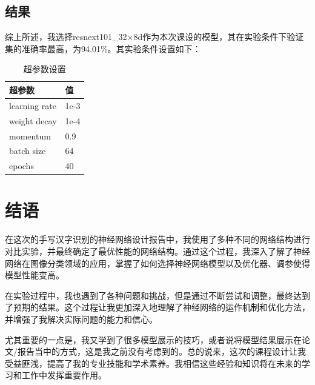 \documentclass[10.5pt,a4paper]{article}%
\begin{document}
        \subsection{结果}
        综上所述，我选择resnext101\_32$\times$8d作为本次课设的模型，其在实验条件下验证集的准确率最高，为94.01\%。其实验条件设置如下：\par
        \begin{table}[!ht]
        \centering
        \begin{tabular}{|l|l|}
        \hline
            超参数 & 值 \\ \hline
            learning rate & 1e-3 \\ \hline
            weight decay & 1e-4 \\ \hline
            momentum & 0.9 \\ \hline
            batch size & 64 \\ \hline
             epochs & 40 \\ \hline
        \end{tabular}
        \caption{超参数设置}
         \end{table}
        
        \section{结语}
        在这次的手写汉字识别的神经网络设计报告中，我使用了多种不同的网络结构进行对比实验，并最终确定了最优性能的网络结构。通过这个过程，我深入了解了神经网络在图像分类领域的应用，掌握了如何选择神经网络模型以及优化器、调参使得模型性能变高。\par
        在实验过程中，我也遇到了各种问题和挑战，但是通过不断尝试和调整，最终达到了预期的结果。这个过程让我更加深入地理解了神经网络的运作机制和优化方法，并增强了我解决实际问题的能力和信心。\par
        尤其重要的一点是，我又学到了很多模型展示的技巧，或者说将模型结果展示在论文/报告当中的方式，这是我之前没有考虑到的。总的说来，这次的课程设计让我受益匪浅，提高了我的专业技能和学术素养。我相信这些经验和知识将在未来的学习和工作中发挥重要作用。
\newpage


\end{document}
